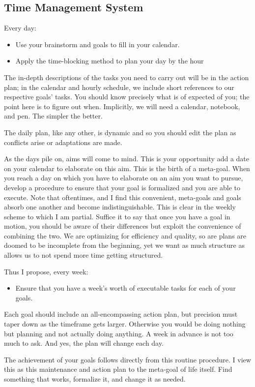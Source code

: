 \documentclass{book}
\numberwithin{equation}{section}
\begin{document}
\subsection{Time Management System}
Every day:
\begin{itemize}
    \item Use your brainstorm and goals to fill in your calendar.
    \item Apply the time-blocking method to plan your day by the hour
\end{itemize}
The in-depth descriptions of the tasks you need to carry out will be in the action plan; in the calendar and hourly schedule, we include short references to our respective goals' tasks. You should know precisely what is of expected of you; the point here is to figure out when. Implicitly, we will need a calendar, notebook, and pen. The simpler the better.

The daily plan, like any other, is dynamic and so you should edit the plan as conflicts arise or adaptations are made.

As the days pile on, aims will come to mind. This is your opportunity add a date on your calendar to elaborate on this aim. This is the birth of a meta-goal. When you reach a day on which you have to elaborate on an aim you want to pursue, develop a procedure to ensure that your goal is formalized and you are able to execute.
Note that oftentimes, and I find this convenient, meta-goals and goals absorb one another and become indistinguishable. This is clear in the weekly scheme to which I am partial. Suffice it to say that once you have a goal in motion, you should be aware of their differences but exploit the convenience of combining the two. We are optimizing for efficiency and quality, so are plans are doomed to be incomplete from the beginning, yet we want as much structure as allows us to not spend more time getting structured.

Thus I propose,
every week:
\begin{itemize}
    \item Ensure that you have a week's worth of executable tasks for each of your goals.
\end{itemize}
Each goal should include an all-encompassing action plan, but precision must taper down as the timeframe gets larger. Otherwise
you would be doing nothing but planning and not actually doing anything. A week in advance is not too much to ask. And yes, the plan will change each day.

The achievement of your goals follows directly from this routine procedure. I view this as this maintenance and action plan to the meta-goal of life itself. Find something that works, formalize it, and change it as needed.
\end{document}

